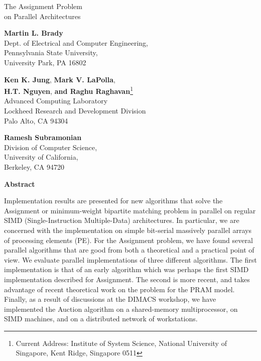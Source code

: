 \begin{titlepage}
\vspace*{.25in}

{\LARGE \bf
\begin{center}
The Assignment Problem \\
on Parallel Architectures
\end{center}
}

{\large

\begin{center}
  {\bf Martin L. Brady}  \\
  Dept. of Electrical and Computer Engineering, \\
  Pennsylvania State University, \\
  University Park, PA 16802
\end{center}

\begin{center}
  {\bf Ken K. Jung}, {\bf Mark V. LaPolla}, \\
  {\bf H.T. Nguyen}, {\bf and Raghu Raghavan}\footnote{Current Address: Institute of System Science, National University of Singapore, Kent Ridge, Singapore 0511} \\
  Advanced Computing Laboratory \\
  Lockheed Research and Development Division \\
  Palo Alto, CA   94304
\end{center}

\begin{center}
  {\bf Ramesh Subramonian} \\
  Division of Computer Science, \\
  University of California, \\
  Berkeley, CA 94720 
\end{center}
}

\vspace*{.25in}

{\small

\begin{center} {\bf Abstract} \end{center}
Implementation results are presented for new algorithms that solve 
the Assignment or minimum-weight bipartite matching problem in parallel 
on regular SIMD (Single-Instruction Multiple-Data) architectures.  
In particular, we are concerned with the implementation on simple 
bit-serial massively parallel arrays of processing elements (PE).  
For the Assignment problem, we have found several parallel algorithms that 
are good from both a theoretical and a practical point of view.  We 
evaluate parallel implementations of three different algorithms.  
The first implementation is that of an early algorithm which was perhaps the 
first SIMD implementation described for Assignment.  The second is 
more recent, and takes advantage of recent theoretical work on 
the problem for the PRAM model.  Finally, as a result of discussions at 
the DIMACS workshop, we have implemented the Auction algorithm on 
a shared-memory multiprocessor, on SIMD machines, and on a distributed
network of workstations.  
}

\end{titlepage}
